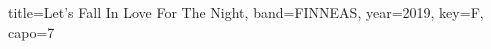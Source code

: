 \documentclass{bekki-leadsheet}
\begin{document}
\begin{song}[transpose-capo=true]{title={Let's Fall In Love For The Night}, band={FINNEAS}, year={2019}, key={F}, capo={7}}



\end{song}
\end{document}
